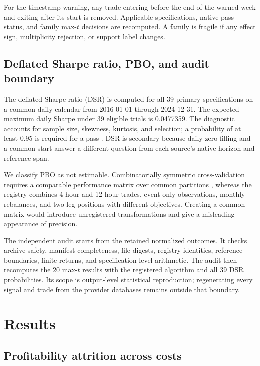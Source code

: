 For the timestamp warning, any trade entering before the end of the warned week and exiting after its start is removed. Applicable specifications, native pass status, and family max-$t$ decisions are recomputed. A family is fragile if any effect sign, multiplicity rejection, or support label changes.

\subsection{Deflated Sharpe ratio, PBO, and audit boundary}\label{subsec:diagnostics}

The deflated Sharpe ratio (DSR) is computed for all 39 primary specifications on a common daily calendar from 2016-01-01 through 2024-12-31. The expected maximum daily Sharpe under 39 eligible trials is 0.0477359. The diagnostic accounts for sample size, skewness, kurtosis, and selection; a probability of at least 0.95 is required for a pass \citep{bailey2014}. DSR is secondary because daily zero-filling and a common start answer a different question from each source's native horizon and reference span.

We classify PBO as not estimable. Combinatorially symmetric cross-validation requires a comparable performance matrix over common partitions \citep{bailey2017}, whereas the registry combines 4-hour and 12-hour trades, event-only observations, monthly rebalances, and two-leg positions with different objectives. Creating a common matrix would introduce unregistered transformations and give a misleading appearance of precision.

The independent audit starts from the retained normalized outcomes. It checks archive safety, manifest completeness, file digests, registry identities, reference boundaries, finite returns, and specification-level arithmetic. The audit then recomputes the 20 max-$t$ results with the registered algorithm and all 39 DSR probabilities. Its scope is output-level statistical reproduction; regenerating every signal and trade from the provider databases remains outside that boundary.

\section{Results}\label{sec:results}

\subsection{Profitability attrition across costs}\label{subsec:attrition}

